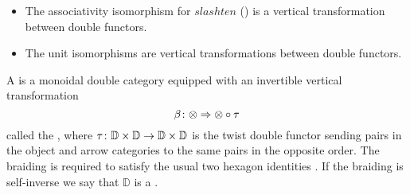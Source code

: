 \begin{itemize}
\item The associativity isomorphism for $slash ten$ () is a vertical transformation between double functors.
		\item The unit isomorphisms are vertical transformations
between double functors.
	\end{itemize}


	\begin{defn}
	\label{defn:symmetric_monoidal_double_category}
A  is a monoidal double
category equipped with an invertible vertical transformation
\[ \beta \colon \otimes \Rightarrow \otimes \circ \tau \]
called the , where $\tau \colon \mathbb{D} \times \mathbb{D} \to \mathbb{D} \times \mathbb{D}$ is the twist double functor sending pairs in the object and arrow categories to the same pairs in the opposite order. The braiding is required to satisfy the usual two hexagon identities \cite[Sec.\ XI.1]{ML}.  If the braiding is self-inverse we say that $\mathbb{D}$ is a .
	\end{defn}
	
